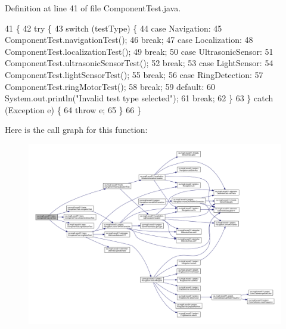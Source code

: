 Definition at line 41 of file Component\+Test.\+java.


\begin{DoxyCode}
41                                                              \{
42     \textcolor{keywordflow}{try} \{
43       \textcolor{keywordflow}{switch} (testType) \{
44         \textcolor{keywordflow}{case} Navigation:
45           ComponentTest.navigationTest();
46           \textcolor{keywordflow}{break};
47         \textcolor{keywordflow}{case} Localization:
48           ComponentTest.localizationTest();
49           \textcolor{keywordflow}{break};
50         \textcolor{keywordflow}{case} UltrasonicSensor:
51           ComponentTest.ultrasonicSensorTest();
52           \textcolor{keywordflow}{break};
53         \textcolor{keywordflow}{case} LightSensor:
54           ComponentTest.lightSensorTest();
55           \textcolor{keywordflow}{break};
56         \textcolor{keywordflow}{case} RingDetection:
57           ComponentTest.ringMotorTest();
58           \textcolor{keywordflow}{break};
59         \textcolor{keywordflow}{default}:
60           System.out.println(\textcolor{stringliteral}{"Invalid test type selected"});
61           \textcolor{keywordflow}{break};
62       \}
63     \} \textcolor{keywordflow}{catch} (Exception e) \{
64       \textcolor{keywordflow}{throw} e;
65     \}
66   \}
\end{DoxyCode}
Here is the call graph for this function\+:\nopagebreak
\begin{figure}[H]
\begin{center}
\leavevmode
\includegraphics[width=350pt]{enumca_1_1mcgill_1_1ecse211_1_1tests_1_1_component_test_a5dc8bf97bc48adf5bee88d425a1a974e_cgraph}
\end{center}
\end{figure}
\mbox{\label{enumca_1_1mcgill_1_1ecse211_1_1tests_1_1_component_test_ae85caa20c6391bacc4fdbd411ee3f113}} 
